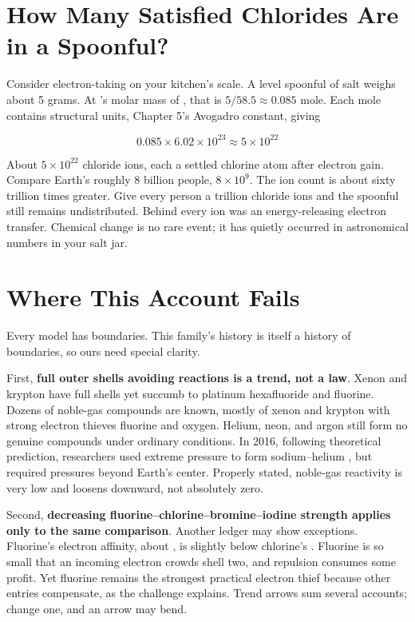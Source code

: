 \section{How Many Satisfied Chlorides Are in a Spoonful?}

Consider electron-taking on your kitchen's scale. A level spoonful of salt weighs about 5 grams. At 's molar mass of , that is $5/58.5 \approx 0.085$ mole. Each mole contains  structural units, Chapter 5's Avogadro constant, giving

\[0.085 \times 6.02\times 10^{23} \approx 5\times 10^{22}\]

About $5\times 10^{22}$ chloride ions, each a settled chlorine atom after electron gain. Compare Earth's roughly 8 billion people, $8\times 10^{9}$. The ion count is about sixty trillion times greater. Give every person a trillion chloride ions and the spoonful still remains undistributed. Behind every ion was an energy-releasing electron transfer. Chemical change is no rare event; it has quietly occurred in astronomical numbers in your salt jar.

\section{Where This Account Fails}

Every model has boundaries. This family's history is itself a history of boundaries, so ours need special clarity.

First, \textbf{full outer shells avoiding reactions is a trend, not a law}. Xenon and krypton have full shells yet succumb to platinum hexafluoride and fluorine. Dozens of noble-gas compounds are known, mostly of xenon and krypton with strong electron thieves fluorine and oxygen. Helium, neon, and argon still form no genuine compounds under ordinary conditions. In 2016, following theoretical prediction, researchers used extreme pressure to form sodium--helium , but required pressures beyond Earth's center. Properly stated, noble-gas reactivity is very low and loosens downward, not absolutely zero.

Second, \textbf{decreasing fluorine--chlorine--bromine--iodine strength applies only to the same comparison}. Another ledger may show exceptions. Fluorine's electron affinity, about , is slightly below chlorine's . Fluorine is so small that an incoming electron crowds shell two, and repulsion consumes some profit. Yet fluorine remains the strongest practical electron thief because other entries compensate, as the challenge explains. Trend arrows sum several accounts; change one, and an arrow may bend.

